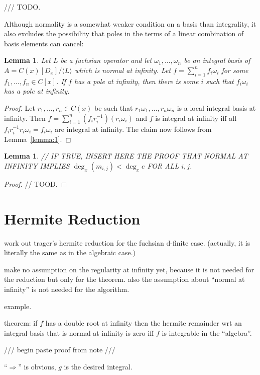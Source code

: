 \documentclass{sig-alternate}
\newtheorem{lemma}[theorem]{Lemma}
\def\<#1>{\langle#1\rangle}
\begin{document}
/// TODO.

Although normality is a somewhat weaker condition on a basis than integrality,
it also excludes the possibility that poles in the terms of a linear combination
of basis elements can cancel:

\begin{lemma}\label{lemma:3}
  Let $L$ be a fuchsian operator and let $\omega_1,\dots,\omega_n$ be an integral basis of $A=C(x)[D_x]/\<L>$
  which is normal at infinity.
  Let $f=\sum_{i=1}^n f_i\omega_i$ for some $f_1,\dots,f_n\in C[x]$.
  If $f$ has a pole at infinity, then there is some $i$ such that $f_i\omega_i$ has a pole at infinity.
\end{lemma}
\begin{proof}
  Let $r_1,\dots,r_n\in C(x)$ be such that $r_1\omega_1,\dots,r_n\omega_n$ is a
  local integral basis at infinity. Then $f=\sum_{i=1}^n
  (f_ir_i^{-1})(r_i\omega_i)$ and $f$ is integral at infinity iff all
  $f_ir_i^{-1}r_i\omega_i=f_i\omega_i$ are integral at infinity.
  The claim now follows from Lemma~\ref{lemma:1}.
\end{proof}

\begin{lemma}
  // IF TRUE, INSERT HERE THE PROOF THAT NORMAL AT INFINITY IMPLIES $\deg_x(m_{i,j})<\deg_x e$ FOR ALL $i,j$.
\end{lemma}
\begin{proof}
  // TOOD.
\end{proof}

\section{Hermite Reduction}

work out trager's hermite reduction for the fuchsian d-finite case. (actually, it is
literally the same as in the algebraic case.)

make no assumption on the regularity at infinity yet, because it is not needed for the
reduction but only for the theorem. also the assumption about ``normal at infinity'' is
not needed for the algorithm.

example.

theorem: if $f$ has a double root at infinity then the hermite remainder wrt an integral
basis that is normal at infinity is zero iff $f$ is integrable in the ``algebra''.

/// begin paste proof from note ///

``$\Rightarrow$'' is obvious, $g$ is the desired integral.
\end{document}

